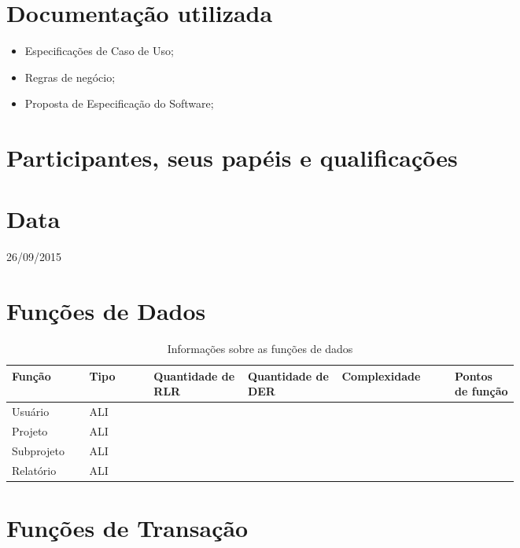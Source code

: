 \section{Documentação utilizada}

\begin{itemize}
 \item Especificações de Caso de Uso;
 \item Regras de negócio;
 \item Proposta de Especificação do Software;
\end{itemize}


\section{Participantes, seus papéis e qualificações}

\section{Data}
26/09/2015

\section{Funções de Dados}

\begin{table*}[!h]
\centering
\caption{Informações sobre as funções de dados}
\label{Rotulo}
  \begin{tabular}{|p{0.10\linewidth}|p{0.10\linewidth}|p{0.14\linewidth}|p{0.14\linewidth}|p{0.17\linewidth}|p{0.10\linewidth}|}
  \hline
  \textbf{Função} & \textbf{Tipo} & \textbf{Quantidade de RLR} & \textbf{Quantidade de DER} & \textbf{Complexidade} & \textbf{Pontos de função} \\
    \hline
  Usuário & ALI & & &  & \\
  \hline
  Projeto & ALI & & &  & \\
  \hline
  Subprojeto & ALI & &  & & \\
  \hline
  Relatório & ALI & &  & & \\
  \hline
  \end{tabular}
\end{table*}

\pagebreak
\section{Funções de Transação}

